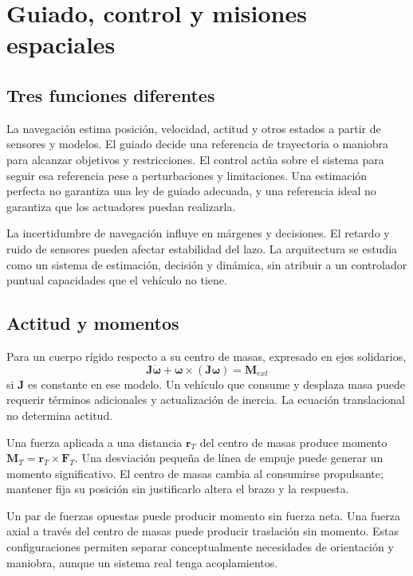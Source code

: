 \chapter{Guiado, control y misiones espaciales}\label{ch:28}
\section{Tres funciones diferentes}
La navegación estima posición, velocidad, actitud y otros estados a partir de sensores y modelos. El guiado decide una referencia de trayectoria o maniobra para alcanzar objetivos y restricciones. El control actúa sobre el sistema para seguir esa referencia pese a perturbaciones y limitaciones. Una estimación perfecta no garantiza una ley de guiado adecuada, y una referencia ideal no garantiza que los actuadores puedan realizarla.

La incertidumbre de navegación influye en márgenes y decisiones. El retardo y ruido de sensores pueden afectar estabilidad del lazo. La arquitectura se estudia como un sistema de estimación, decisión y dinámica, sin atribuir a un controlador puntual capacidades que el vehículo no tiene.
\section{Actitud y momentos}
Para un cuerpo rígido respecto a su centro de masas, expresado en ejes solidarios,
\begin{equation}\label{eq:attitude}
 \mathbf J\dot{\boldsymbol\omega}
 +\boldsymbol\omega\times(\mathbf J\boldsymbol\omega)
 =\mathbf M_{ext}
\end{equation}
si $\mathbf J$ es constante en ese modelo. Un vehículo que consume y desplaza masa puede requerir términos adicionales y actualización de inercia. La ecuación translacional no determina actitud.

Una fuerza aplicada a una distancia $\mathbf r_T$ del centro de masas produce momento $\mathbf M_T=\mathbf r_T\times\mathbf F_T$. Una desviación pequeña de línea de empuje puede generar un momento significativo. El centro de masas cambia al consumirse propulsante; mantener fija su posición sin justificarlo altera el brazo y la respuesta.

Un par de fuerzas opuestas puede producir momento sin fuerza neta. Una fuerza axial a través del centro de masas puede producir traslación sin momento. Estas configuraciones permiten separar conceptualmente necesidades de orientación y maniobra, aunque un sistema real tenga acoplamientos.
